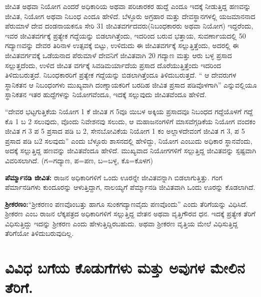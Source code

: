 ಜೀವಿತ ಅಥವಾ ನಿಯೋಗ ಎಂದರೆ ಅಧಿಕಾರಿಯ ಅಥವಾ ಪರಿಚಾರಕರ ಹುದ್ದೆ ಎಂದೂ ಇದಕ್ಕೆ ನೀಡುತ್ತಿದ್ದ ಹಣವನ್ನು ಜೀವಿತ, ನಿಯೋಗ ಅಥವಾ ನಿಬಂಧ ಎಂದೂ ಹೇಳಿದೆ. ಬೆಳ್ಳೂರು ಅಗ್ರಹಾರ ಮತ್ತು ದೇವಸ್ಥಾನಗಳಲ್ಲಿ ಯಜಮಾನನಾದ ಪೆರುಮಾಳೆ ದೇವ ದಂಡನಾಯಕನೂ ಸೇರಿ 31 ಜೀವಿತವರ್ಗದವರು(ನಿಬಂಧಕಾರರು ಅಥವಾ ನಿಯೋಗ) ಇದ್ದರೆಂದು, ಇವರ ಜೀವಿತವರ್ಗಕ್ಕೆ ಪ್ರತ್ಯೇಕ ಗದ್ದೆಯನ್ನು ಬಿಡಲಾಗಿತ್ತೆಂದು, ಇದರಿಂದ ಬರುವ ಭತ್ತಾಯ, ಸುವರ್ಣಾಯದಲ್ಲಿ 50 ಗದ್ಯಾಣವನ್ನು ದೇವರ ತಿರಿನಾಳ ಉತ್ಸವಕ್ಕೆ ಬಿಟ್ಟು, ಉಳಿದುದು ಈ ಜೀವಿತವರ್ಗಕ್ಕೆ ಸಲ್ಲುತ್ತಿತ್ತೆಂದು, ಅದರಲ್ಲಿ ಈ ಜೀವಿತವರ್ಗವಕ್ಕೆ ಒಡೆಯನಾದ ಪೆರುಮಾಳೆ ದೇವನಿಗೆ ಜೀವಿತವಾಗಿ 20 ಗದ್ಯಾಣ ಮತ್ತು ಆರು ಬಳ್ಳ ಪ್ರಸಾದ ಸಲ್ಲುತ್ತದೆಂದು, ಉಳಿದ ಜೀವಿತ ವರ್ಗಕ್ಕೆ ಸಿವಡಿಮರ್ಯಾದೆಯ ಪ್ರಸಾದ ದೊರೆಯುತ್ತಿತ್ತೆಂದು ಇದರಿಂದ ತಿಳಿದುಬರುತ್ತದೆ. ನಿಬಂಧಕಾರರಿಗೆ ಪ್ರತ್ಯೇಕ ಗದ್ದೆಯನ್ನು ಬಿಡಲಾಗಿತ್ತೆಂದೂ ತಿಳಿದುಬರುತ್ತದೆ. “ ಆ ದೇವರುಗಳ ಸ್ಥಾನಿಕತನ ಆ ನಿಬಂಧಂಗಳು ಮುಖ್ಯವಾಗಿ ದಂಣ್ನಾಯಕರಿಗೆ ಬರದಿಹ ಜೀವಿತ ಪ್ರಸಾದ ಪಡಿವೊಳಗಾಗಿ” ಎನ್ನುವಲ್ಲಿಯೂ ಸ್ಥಾನಿಕತನ ಇತರ ಹುದ್ದೆಗಳನ್ನು ನಿಯೋಗವೆಂದೂ, ಇದಕ್ಕೆ ಸಲ್ಲುವುದು ಜೀವಿತವೆಂದೂ ಹೇಳಿದೆ.

“ದೇವರ ಭಟ್ಟಗುತ್ತಿಕೆಯ ನಿಯೋಗ 1 ಕೆ ಜೀವಿತ ಗ 5ವೂ ಯಿಬಳ ಅಕ್ಕಿಯ ಪ್ರಸಾದವೂ ನಿಬಂಧದ ಗದ್ದೆಯೊಳಗೆ ಗದ್ದೆ ಕೊ 1 ಬ 2 ಸಲುವುದು, ವೊಂದು ನಿವೇಶನವು ಸಲುದು, ಆ ಮಹಾಜನಂಗಳಿಗೆ ಮಾಸವೆಗ್ಗಡಿಕೆಯ ನಿಯೋಗ ವಂದಕಂ ಜೀವಿತ ಗ 3 ಪ 5 ಪ್ರಸಾದ ಪಡಿ ಬ 2, ಸೇನಬೋವಿಕೆಯ ನಿಯೋಗ 1 ಕಂ ಅಲ್ಲಾಳದೇವಂಗೆ ಜೀವಿತ ಗ 3, ಪ 5 ಪ್ರಸಾದ ಪಡಿ ಬ2 ಸಲವುದು” ಎಂದು ಬೆಳ್ಳೂರು ಶಾಸನದಲ್ಲಿ ಹೇಳಿದ್ದು, ನಿಯೋಗ ಎಂಬುದು ಅಧಿಕಾರ ಸ್ಥಾನವೆಂದು, ಅದಕ್ಕೆ ಸಲ್ಲುತ್ತಿದ್ದ ಹಣವನ್ನು ಜೀವಿತವೆಂದೂ ಹೇಳಿದೆ. ಮುಖ್ಯವಾದ ನಿಯೋಗಗಳಿಗೆ ಸಲ್ಲುತ್ತಿದ್ದ ಜೀವಿತವನ್ನು ಸ್ಪಷ್ಟವಾಗಿ ವಿವರಿಸಲಾಗಿದೆ. (ಗ=ಗದ್ಯಾಣ, ಪ=ಪಣ, ಬ=ಬಳ್ಳ, ಕೊ=ಕೊಳಗ)

\textbf{ಪೆರ್ಮ್ಮಾನಡಿ ಜೀವಿತ:} ರಾಜನ ಅಧಿಕಾರಿಗಳಿಗೆ ಒಂದು ಊರನ್ನೇ ಜೀವಿತವನ್ನಾಗಿ ಬಿಡಲಾಗುತ್ತಿತ್ತು. ಗಂಗ ಪೆರ್ಮಾನಡಿಗಳು ಕುಂದೂರನ್ನು ಆಳುತ್ತಿದ್ದಾಗ, ನಾಲಯ್ಯಗೆ ಪೆರ್ಮ್ಮಾನಡಿ ಜೀವಿತವಾಗಿ ಒಂದು ಊರನ್ನು ಕೊಡಲಾಗಿದೆ.

\textbf{ಶ‍್ರೀಕರಣಂ:}“ಶ‍್ರೀಕರಣಂ ಪಣವೊಂಬತ್ತು ಹಾಗೂ ಸುಂಕಗದ್ಯಾಣವೈದು ಪಣವೊಂದು” ಎಂದು ತೆರಿಗೆಯನ್ನು ವಿಧಿಸಿದೆ. ಶ‍್ರೀಕರಣ ಎಂಬ ರಾಜನ ಲೆಕ್ಕಪತ್ರದ ಅಧಿಕಾರಿಗಳಿಗೆ ಸಲ್ಲುತ್ತಿದ್ದ ವೇತನ ಅಥವಾ ವೃತ್ತಿಗೌರವ ಧನ. ಇದಕ್ಕೆ ಪ್ರತ್ಯೇಕ ತೆರಿಗೆ ವಿಧಿಸುತ್ತಿದ್ದು ಇದನ್ನು ಶ‍್ರೀಕರಣ ಎಂದು ಹೇಳುತ್ತಿದ್ದಿರಬಹುದು. ಅಥವಾ ಶ‍್ರೀಕರಣ ವೃತ್ತಿಯ ಮೇಲೆ ವಿಧಿಸುತ್ತಿದ್ದ ತೆರಿಗೆಯೋ ತಿಳಿದುಬರುವುದಿಲ್ಲ.

\vskip -4pt

\section*{ವಿವಿಧ ಬಗೆಯ ಕೊಡುಗೆಗಳು ಮತ್ತು ಅವುಗಳ ಮೇಲಿನ ತೆರಿಗೆ.}

